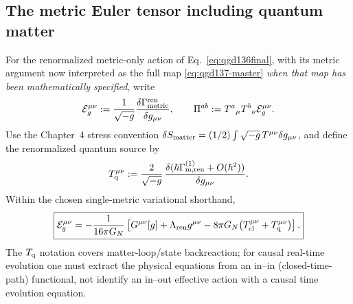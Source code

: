 \documentclass[11pt,a4paper]{article}
\begin{document}
\subsection{The metric Euler tensor including quantum matter}
For the renormalized metric-only action of Eq.~\eqref{eq:qgd136final},
with its metric argument now interpreted as the full map
\eqref{eq:qgd137-master} \emph{when that map has been mathematically
specified}, write
\begin{equation}\label{eq:qgd137-Pi}
\mathcal E_g^{\mu\nu}:=\frac{1}{\sqrt{-g}}
\frac{\delta\Gamma_{\rm metric}^{\rm ren}}{\delta g_{\mu\nu}},
\qquad
\Pi^{ab}:=T^a{}_{\mu}T^b{}_{\nu}\mathcal E_g^{\mu\nu}.
\end{equation}
Use the Chapter~4 stress convention
$\delta S_{\rm matter}=(1/2)\int\sqrt{-g}\,T^{\mu\nu}\delta g_{\mu\nu}$,
and define the renormalized quantum source by
\begin{equation}\label{eq:qgd137-Tq}
T_{\rm q}^{\mu\nu}:=\frac{2}{\sqrt{-g}}\,
\frac{\delta(\hbar\Gamma_{\rm m,ren}^{(1)}+O(\hbar^2))}
{\delta g_{\mu\nu}}.
\end{equation}
Within the chosen single-metric variational shorthand,
\begin{equation}\label{eq:qgd137-Eg}
\boxed{\mathcal E_g^{\mu\nu}=
-\frac{1}{16\pi G_N}\left[
G^{\mu\nu}[g]+\Lambda_{\rm ren}g^{\mu\nu}
-8\pi G_N\bigl(T_{\rm cl}^{\mu\nu}+T_{\rm q}^{\mu\nu}\bigr)
\right].}
\end{equation}
The $T_{\rm q}$ notation covers matter-loop/state backreaction;
for causal real-time evolution one must extract the physical equations
from an in--in (closed-time-path) functional, not identify an
in--out effective action with a causal time evolution equation.
\end{document}
